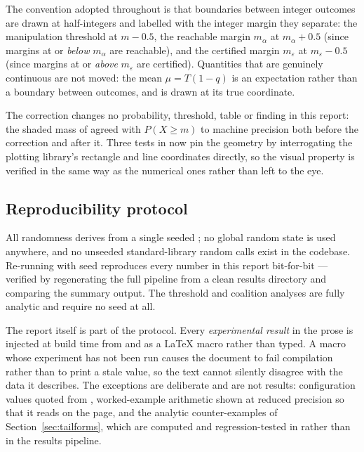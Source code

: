 The convention adopted throughout is that boundaries between integer
outcomes are drawn at half-integers and labelled with the integer
margin they separate: the manipulation threshold at $m - 0.5$, the
reachable margin $m_\alpha$ at $m_\alpha + 0.5$ (since margins at or
\emph{below} $m_\alpha$ are reachable), and the certified margin
$m_\varepsilon$ at $m_\varepsilon - 0.5$ (since margins at or
\emph{above} $m_\varepsilon$ are certified). Quantities that are
genuinely continuous are not moved: the mean $\mu = T(1-q)$ is an
expectation rather than a boundary between outcomes, and is drawn at
its true coordinate.

The correction changes no probability, threshold, table or finding in
this report: the shaded mass of  agreed with
$P(X \geq m)$ to machine precision both before the correction and
after it. Three tests in
 now pin the geometry by
interrogating the plotting library's rectangle and line coordinates
directly, so the visual property is verified in the same way as the
numerical ones rather than left to the eye.

\subsection{Reproducibility protocol}
\label{sec:reproducibility}

All randomness derives from a single seeded
; no global random state is used anywhere,
and no unseeded standard-library random calls exist in the codebase.
Re-running with seed \Seed{} reproduces every number in this report
bit-for-bit --- verified by regenerating the full pipeline from a clean
results directory and comparing the summary output. The threshold and
coalition analyses are fully analytic and require no seed at all.

The report itself is part of the protocol. Every \emph{experimental
result} in the prose is injected at build time from
 and  as a \LaTeX{} macro rather
than typed. A macro whose experiment has not been run causes the
document to fail compilation rather than to print a stale value, so the
text cannot silently disagree with the data it describes. The exceptions
are deliberate and are not results: configuration values quoted from
, worked-example arithmetic shown at reduced precision
so that it reads on the page, and the analytic counter-examples of
Section~\ref{sec:tailforms}, which are computed and regression-tested in
 rather than in the results pipeline.

